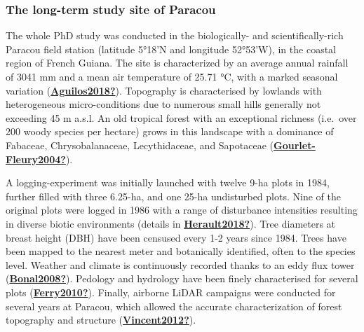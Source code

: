 \documentclass[12pt,twoside,a4paper, a]{article}
\begin{document}
\hypertarget{the-long-term-study-site-of-paracou}{%
\subsubsection{The long-term study site of Paracou}\label{the-long-term-study-site-of-paracou}}

The whole PhD study was conducted in the biologically- and scientifically-rich Paracou field station (latitude 5°18'N and longitude 52°53'W), in the coastal region of French Guiana.
The site is characterized by an average annual rainfall of 3041 mm and a mean air temperature of 25.71 °C,
with a marked seasonal variation (\protect\hyperlink{ref-Aguilos2018}{\textbf{Aguilos2018?}}).
Topography is characterised by lowlands with heterogeneous micro-conditions due to numerous small hills generally not exceeding 45 m a.s.l.
An old tropical forest with an exceptional richness (i.e.~over 200 woody species per hectare) grows in this landscape with a dominance of Fabaceae, Chrysobalanaceae, Lecythidaceae, and Sapotaceae (\protect\hyperlink{ref-Gourlet-Fleury2004}{\textbf{Gourlet-Fleury2004?}}).

A logging-experiment was initially launched with twelve 9-ha plots in 1984, further filled with three 6.25-ha, and one 25-ha undisturbed plots.
Nine of the original plots were logged in 1986 with a range of disturbance intensities resulting in diverse biotic environments (details in \protect\hyperlink{ref-Herault2018}{\textbf{Herault2018?}}).
Tree diameters at breast height (DBH) have been censused every 1-2 years since 1984.
Trees have been mapped to the nearest meter and botanically identified, often to the species level.
Weather and climate is continuously recorded thanks to an eddy flux tower (\protect\hyperlink{ref-Bonal2008}{\textbf{Bonal2008?}}).
Pedology and hydrology have been finely characterised for several plots (\protect\hyperlink{ref-Ferry2010}{\textbf{Ferry2010?}}).
Finally, airborne LiDAR campaigns were conducted for several years at Paracou, which allowed the accurate characterization of forest topography and structure (\protect\hyperlink{ref-Vincent2012}{\textbf{Vincent2012?}}).
\end{document}
